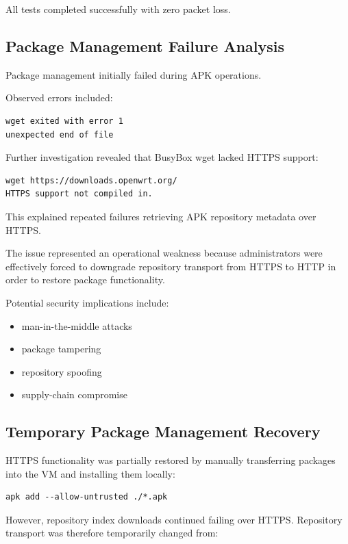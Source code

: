 \documentclass[conference]{IEEEtran}
\begin{document}
All tests completed successfully with zero packet loss.

\subsection{Package Management Failure Analysis}

Package management initially failed during APK operations.

Observed errors included:

\begin{verbatim}
wget exited with error 1
unexpected end of file
\end{verbatim}

Further investigation revealed that BusyBox wget lacked HTTPS support:

\begin{verbatim}
wget https://downloads.openwrt.org/
HTTPS support not compiled in.
\end{verbatim}

This explained repeated failures retrieving APK repository metadata over HTTPS.

The issue represented an operational weakness because administrators were effectively forced to downgrade repository transport from HTTPS to HTTP in order to restore package functionality.

Potential security implications include:

\begin{itemize}
    \item man-in-the-middle attacks
    \item package tampering
    \item repository spoofing
    \item supply-chain compromise
\end{itemize}

\subsection{Temporary Package Management Recovery}

HTTPS functionality was partially restored by manually transferring packages into the VM and installing them locally:

\begin{verbatim}
apk add --allow-untrusted ./*.apk
\end{verbatim}

However, repository index downloads continued failing over HTTPS. Repository transport was therefore temporarily changed from:
\end{document}
